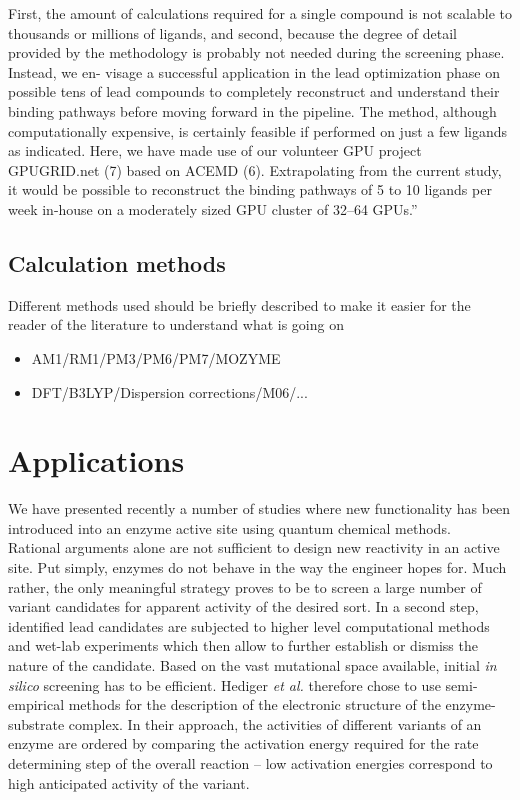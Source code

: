 \begin{itemize}
{First, the amount of calculations required for a single compound is not scalable to thousands or millions of ligands, and second, because the degree of detail provided by the methodology is probably not needed during the screening phase.
Instead, we en- visage a successful application in the lead optimization phase on possible tens of lead compounds to completely reconstruct and understand their binding pathways before moving forward in the pipeline.
The method, although computationally expensive, is certainly feasible if performed on just a few ligands as indicated.
Here, we have made use of our volunteer GPU project GPUGRID.net (7) based on ACEMD (6).
Extrapolating from the current study, it would be possible to reconstruct the binding pathways of 5 to 10 ligands per week in-house on a moderately sized GPU cluster of 32–64 GPUs.}''\cite{buch2011complete}
\end{itemize}

\subsection{Calculation methods}
Different methods used should be briefly described to make it easier for the reader of the literature to understand what is going on
\begin{itemize}
\item AM1/RM1/PM3/PM6/PM7/MOZYME
\item DFT/B3LYP/Dispersion corrections/M06/...
\end{itemize}


\section{Applications}\label{sec:apps}
We have presented recently a number of studies where new functionality has been introduced into an enzyme active site using quantum chemical methods\cite{10.1371/journal.pone.0049849,hediger2013silico,hediger2013computational}.\\
Rational arguments alone are not sufficient to design new reactivity in an active site.
Put simply, enzymes do not behave in the way the engineer hopes for.
Much rather, the only meaningful strategy proves to be to screen a large number of variant candidates for apparent activity of the desired sort.
In a second step, identified lead candidates are subjected to higher level computational methods and wet-lab experiments which then allow to further establish or dismiss the nature of the candidate.
Based on the vast mutational space available, initial \textit{in silico} screening has to be efficient.
Hediger \textit{et al.} therefore chose to use semi-empirical methods for the description of the electronic structure of the enzyme-substrate complex.
In their approach, the activities of different variants of an enzyme are ordered by comparing the activation energy required for the rate determining step of the overall reaction -- low activation energies correspond to high anticipated activity of the variant.

